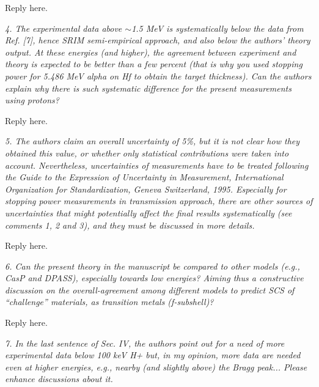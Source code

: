 \documentclass[a4paper,10pt]{article}
\begin{document}
\vspace{0.1cm}
{\color{red}Reply here.}

\vspace{0.25cm}
\textsl{4. The experimental data above $\sim$1.5 MeV is systematically 
below the data from Ref. [7], hence SRIM semi-empirical approach, and 
also below the authors’ theory output. At these energies (and higher), 
the agreement between experiment and theory is expected to be better than
a few percent (that is why you used stopping power for 5.486 MeV alpha
on Hf to obtain the target thickness). Can the authors explain why
there is such systematic difference for the present measurements using
protons?}

\vspace{0.1cm}
{\color{red}Reply here.}

\vspace{0.25cm}
\textsl{5. The authors claim an overall uncertainty of 5\%, but it is not clear
how they obtained this value, or whether only statistical
contributions were taken into account. Nevertheless, uncertainties of
measurements have to be treated following the Guide to the Expression
of Uncertainty in Measurement, International Organization for
Standardization, Geneva Switzerland, 1995. Especially for stopping
power measurements in transmission approach, there are other sources
of uncertainties that might potentially affect the final results
systematically (see comments 1, 2 and 3), and they must be discussed
in more details.}

\vspace{0.1cm}
{\color{red}Reply here.}

\vspace{0.25cm}
\textsl{6. Can the present theory in the manuscript be compared to other
models (e.g., CasP and DPASS), especially towards low energies? Aiming
thus a constructive discussion on the overall-agreement among
different models to predict SCS of “challenge” materials, as
transition metals (f-subshell)?}

\vspace{0.1cm}
{\color{red}Reply here.}

\vspace{0.25cm}
\textsl{7. In the last sentence of Sec. IV, the authors point out for a need
of more experimental data below 100 keV H+ but, in my opinion, more
data are needed even at higher energies, e.g., nearby (and slightly
above) the Bragg peak... Please enhance discussions about it.}
\end{document}
